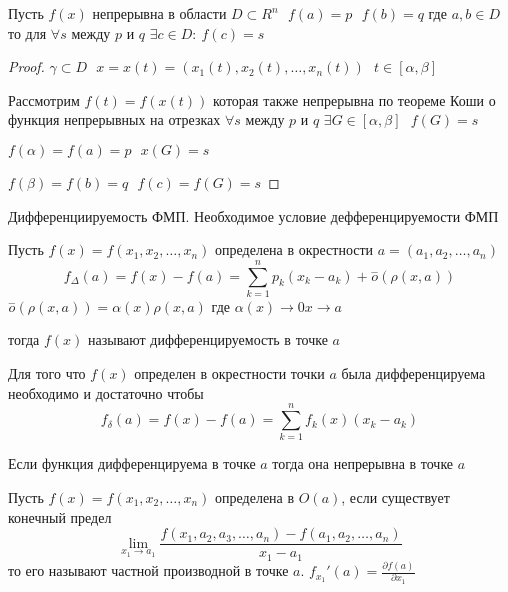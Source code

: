 \begin{theorem}
  Пусть $f(x)$ непрерывна в области $D \subset R^n ~~~ f(a) = p ~~~ f(b) = q$
  где $a,b \in D$ то для $\forall s$ между $p$ и $q$
  $\exists c \in D: ~ f(c) = s$
\end{theorem}

\begin{proof}
  $\gamma \subset D ~~~ x = x(t) = (x_1(t), x_2(t), \ldots, x_n(t)) ~~~
  t \in [\alpha, \beta]$

  Рассмотрим $f(t) = f(x(t))$ которая также непрерывна по теореме Коши о
  функция непрерывных на отрезках $\forall s$ между $p$ и $q$
  $\exists G \in [\alpha, \beta] ~~~ f(G) = s$

  $f(\alpha) = f(a) = p ~~~ x(G) = s$

  $f(\beta) = f(b) = q ~~~ f(c) = f(G) = s$
\end{proof}

\begin{title}[\Large]
  Дифференциируемость ФМП. Необходимое условие дефференцируемости ФМП
\end{title}

\begin{define}
  Пусть $f(x) = f(x_1, x_2, \ldots, x_n)$ определена в окрестности
  $a = (a_1, a_2, \ldots, a_n)$
  $$
  f_{\Delta}(a) = f(x) - f(a) = \sum_{k=1}^n p_k (x_k - a_k) +
  \stackrel{-}{o}(\rho(x, a))
  $$
  $\stackrel{-}{o}(\rho(x, a)) = \alpha(x) \rho(x, a)$ где $\alpha(x) \to 0
  x \to a$

  тогда $f(x)$ называют дифференцируемость в точке $a$
\end{define}

\begin{block}[Критерий]
  Для того что $f(x)$ определен в окрестности точки $a$ была дифференцируема
  необходимо и достаточно чтобы
  $$
  f_{\delta}(a) = f(x) - f(a) = \sum_{k=1}^n f_k(x)(x_k - a_k)
  $$
\end{block}

\begin{theorem}
  Если функция дифференцируема в точке $a$ тогда она непрерывна в точке $a$
\end{theorem}

\begin{define}
  Пусть $f(x) = f(x_1, x_2, \ldots, x_n)$ определена в $O(a)$, если существует
  конечный предел
  $$
  \lim_{x_1 \to a_1}
  \frac{f(x_1, a_2, a_3, \ldots, a_n) - f(a_1, a_2, \ldots, a_n)}{x_1 - a_1}
  $$
  то его называют частной производной в точке $a$. $f_{x_1}'(a) =
  \frac{\partial f(a)}{\partial x_1}$
\end{define}

